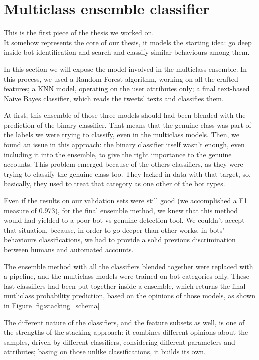 \section{Multiclass ensemble classifier}
This is the first piece of the thesis we worked on.\\
It somehow represents the core of our thesis, it models the starting idea: go deep inside bot identification and search and classify similar behaviours among them.

In this section we will expose the model involved in the multiclass ensemble. In this process, we used a Random Forest algorithm, working on all the crafted features; a KNN model, operating on the user attributes only; a final text-based Naive Bayes classifier, which reads the tweets' texts and classifies them.

At first, this ensemble of those three models should had been blended with the prediction of the binary classifier. That means that the genuine class was part of the labels we were trying to classify, even in the multiclass models. Then, we found an issue in this approach: the binary classifier itself wasn't enough, even including it into the ensemble, to give the right importance to the genuine accounts. This problem emerged because of the others classifiers, as they were trying to classify the genuine class too. They lacked in data with that target, so, basically, they used to treat that category as one other of the bot types.

Even if the results on our validation sets were still good (we accomplished a F1 measure of 0.973), for the final ensemble method, we knew that this method would had yielded to a poor bot vs genuine detection tool. We couldn't accept that situation, because, in order to go deeper than other works, in bots' behaviours classifications, we had to provide a solid previous discrimination between humans and automated accounts.

The ensemble method with all the classifiers blended together were replaced with a pipeline, and the multiclass models were trained on bot categories only.
These last classifiers had been put together inside a  ensemble, which returns the final mutliclass probability prediction, based on the opinions of those models, as shown in Figure \ref{fig:stacking_schema}

The different nature of the classifiers, and the feature subsets as well, is one of the strengths of the stacking approach: it combines different opinions about the samples, driven by different classifiers, considering different parameters and attributes; basing on those unlike classifications, it builds its own.

